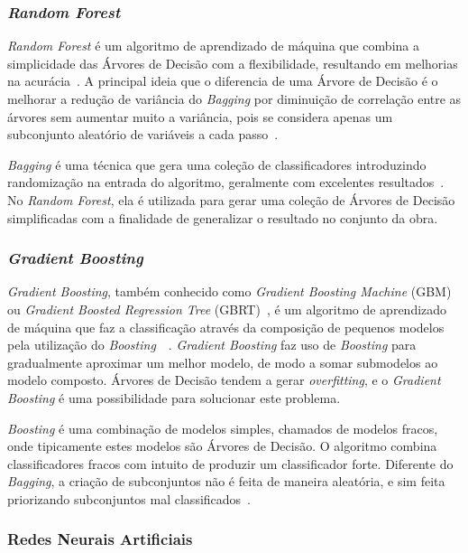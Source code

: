 \documentclass[portugues]{ic-tese}
\begin{document}
\subsubsection{\textit{Random Forest}}

\textit{Random Forest} é um algoritmo de aprendizado de máquina que combina a simplicidade das Árvores de Decisão com a flexibilidade, resultando em melhorias na acurácia~\citep{Breiman_2001}. A principal ideia que o diferencia de uma Árvore de Decisão é o melhorar a redução de variância do \textit{Bagging} por diminuição de correlação entre as árvores sem aumentar muito a variância, pois se considera apenas um subconjunto aleatório de variáveis a cada passo~\citep{Breiman_2001}.

\textit{Bagging} é uma técnica que gera uma coleção de classificadores introduzindo randomização na entrada do algoritmo, geralmente com excelentes resultados~\citep{Witten_2016}. No \textit{Random Forest}, ela é utilizada para gerar uma coleção de Árvores de Decisão simplificadas com a finalidade de generalizar o resultado no conjunto da obra.

\subsubsection{\textit{Gradient Boosting}}

\textit{Gradient Boosting}, também conhecido como \textit{Gradient Boosting Machine} (GBM) ou \textit{Gradient Boosted Regression Tree} (GBRT)~\citep{Chen_2016}, é um algoritmo de aprendizado de máquina que faz a classificação através da composição de pequenos modelos pela utilização do \textit{Boosting}~\citep{Friedman_2000}~\citep{Hastie_2009}. \textit{Gradient Boosting} faz uso de \textit{Boosting} para gradualmente aproximar um melhor modelo, de modo a somar submodelos ao modelo composto. Árvores de Decisão tendem a gerar \textit{overfitting}, e o \textit{Gradient Boosting} é uma possibilidade para solucionar este problema.

\textit{Boosting} é uma combinação de modelos simples, chamados de modelos fracos, onde tipicamente estes modelos são Árvores de Decisão. O algoritmo combina classificadores fracos com intuito de produzir um classificador forte. Diferente do \textit{Bagging}, a criação de subconjuntos não é feita de maneira aleatória, e sim feita priorizando subconjuntos mal classificados~\citep{Hastie_2009}.

\subsubsection{Redes Neurais Artificiais}
\end{document}
